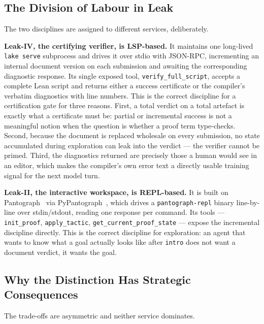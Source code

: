 \documentclass[12pt, a4paper]{article}
\begin{document}
\subsection{The Division of Labour in Leak}

The two disciplines are assigned to different services, deliberately.

\textbf{Leak-IV, the certifying verifier, is LSP-based.} It maintains one
long-lived \texttt{lake serve} subprocess and drives it over stdio with
JSON-RPC, incrementing an internal document version on each submission and
awaiting the corresponding diagnostic response. Its single exposed tool,
\texttt{verify\_full\_script}, accepts a complete Lean script and returns
either a success certificate or the compiler's verbatim diagnostics with
line numbers. This is the correct discipline for a certification gate for
three reasons. First, a total verdict on a total artefact is exactly what a
certificate must be: partial or incremental success is not a meaningful
notion when the question is whether a proof term type-checks. Second,
because the document is replaced wholesale on every submission, no state
accumulated during exploration can leak into the verdict --- the verifier
cannot be primed. Third, the diagnostics returned are precisely those a
human would see in an editor, which makes the compiler's own error text a
directly usable training signal for the next model turn.

\textbf{Leak-II, the interactive workspace, is REPL-based.} It is built on
Pantograph~\cite{aniva2024pantograph} via
PyPantograph~\cite{pypantograph}, which drives a \texttt{pantograph-repl}
binary line-by-line over stdin/stdout, reading one response per command.
Its tools --- \texttt{init\_proof}, \texttt{apply\_tactic},
\texttt{get\_current\_proof\_state} --- expose the incremental discipline
directly. This is the correct discipline for exploration: an agent that
wants to know what a goal actually looks like after \texttt{intro} does not
want a document verdict, it wants the goal.

\subsection{Why the Distinction Has Strategic Consequences}

The trade-offs are asymmetric and neither service dominates.
\end{document}

